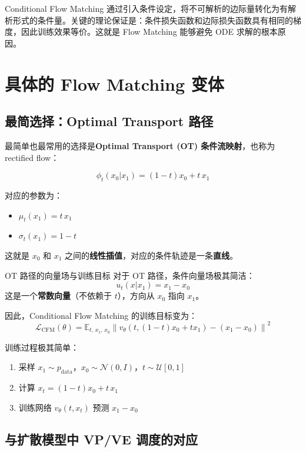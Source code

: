 \documentclass[a4paper]{article}
\begin{document}
Conditional Flow Matching 通过引入条件设定，将不可解析的边际量转化为有解析形式的条件量。关键的理论保证是：条件损失函数和边际损失函数具有相同的梯度，因此训练效果等价。这就是 Flow Matching 能够避免 ODE 求解的根本原因。


\section{具体的 Flow Matching 变体}

\subsection{最简选择：Optimal Transport 路径}

最简单也最常用的选择是\textbf{Optimal Transport (OT) 条件流映射}，也称为 rectified flow：

$$\phi_t(x_0 | x_1) = (1 - t) x_0 + t \, x_1$$

对应的参数为：
\begin{itemize}
    \item $\mu_t(x_1) = t \, x_1$
    \item $\sigma_t(x_1) = 1 - t$
\end{itemize}

这就是 $x_0$ 和 $x_1$ 之间的\textbf{线性插值}，对应的条件轨迹是一条\textbf{直线}。

\begin{importantbox}{OT 路径的向量场与训练目标}
对于 OT 路径，条件向量场极其简洁：
$$u_t(x | x_1) = x_1 - x_0$$
这是一个\textbf{常数向量}（不依赖于 $t$），方向从 $x_0$ 指向 $x_1$。

因此，Conditional Flow Matching 的训练目标变为：
$$\mathcal{L}_{\text{CFM}}(\theta) = \mathbb{E}_{t, \, x_1, \, x_0} \left\| v_\theta(t, (1-t)x_0 + t x_1) - (x_1 - x_0) \right\|^2$$

训练过程极其简单：
\begin{enumerate}
    \item 采样 $x_1 \sim p_{\text{data}}$，$x_0 \sim \mathcal{N}(0, I)$，$t \sim \mathcal{U}[0,1]$
    \item 计算 $x_t = (1-t)x_0 + t \, x_1$
    \item 训练网络 $v_\theta(t, x_t)$ 预测 $x_1 - x_0$
\end{enumerate}
\end{importantbox}

\subsection{与扩散模型中 VP/VE 调度的对应}
\end{document}
